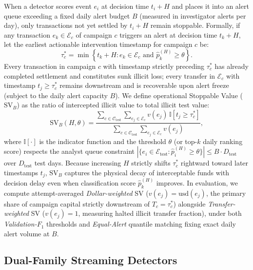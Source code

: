 \documentclass[pdflatex,sn-mathphys,Numbered]{sn-jnl}
\theoremstyle{thmstyleone}
\begin{document}
When a detector scores event $e_i$ at decision time $t_i + H$ and places it into an alert queue exceeding a fixed daily alert budget $B$ (measured in investigator alerts per day), only transactions not yet settled by $t_i + H$ remain stoppable. Formally, if any transaction $e_k \in \mathcal{E}_c$ of campaign $c$ triggers an alert at decision time $t_k + H$, let the earliest actionable intervention timestamp for campaign $c$ be:
\begin{equation}\label{eq:earliest_stop}
\tau_c^* = \min \left\{ t_k + H : e_k \in \mathcal{E}_c \text{ and } \hat{p}_k^{(H)} \ge \theta \right\}.
\end{equation}
Every transaction in campaign $c$ with timestamp strictly preceding $\tau_c^*$ has already completed settlement and constitutes sunk illicit loss; every transfer in $\mathcal{E}_c$ with timestamp $t_j \ge \tau_c^*$ remains downstream and is recoverable upon alert freeze (subject to the daily alert capacity $B$). We define operational Stoppable Value ($\text{SV}_B$) as the ratio of intercepted illicit value to total illicit test value:
\begin{equation}\label{eq:stoppable_value}
\text{SV}_B(H, \theta) = \frac{\sum_{c \in \mathcal{C}_{\text{test}}} \sum_{e_j \in \mathcal{E}_c} v(e_j) \, \mathbb{I}\!\left[ t_j \ge \tau_c^* \right]}{\sum_{c \in \mathcal{C}_{\text{test}}} \sum_{e_j \in \mathcal{E}_c} v(e_j)},
\end{equation}
where $\mathbb{I}[\cdot]$ is the indicator function and the threshold $\theta$ (or top-$k$ daily ranking score) respects the analyst queue constraint $|\{ e_i \in \mathcal{E}_{\text{test}} : \hat{p}_i^{(H)} \ge \theta \}| \le B \cdot D_{\text{test}}$ over $D_{\text{test}}$ test days. Because increasing $H$ strictly shifts $\tau_c^*$ rightward toward later timestamps $t_j$, $\text{SV}_B$ captures the physical decay of interceptable funds with decision delay even when classification score $\hat{p}_k^{(H)}$ improves. In evaluation, we compute attempt-averaged \emph{Dollar-weighted} SV ($v(e_j) = \text{usd}(e_j)$, the primary share of campaign capital strictly downstream of $T_c = \tau_c^*$) alongside \emph{Transfer-weighted} SV ($v(e_j) = 1$, measuring halted illicit transfer fraction), under both \emph{Validation-$F_1$} thresholds and \emph{Equal-Alert} quantile matching fixing exact daily alert volume at $B$.

\subsection{Dual-Family Streaming Detectors}\label{sec:detectors}
\end{document}
